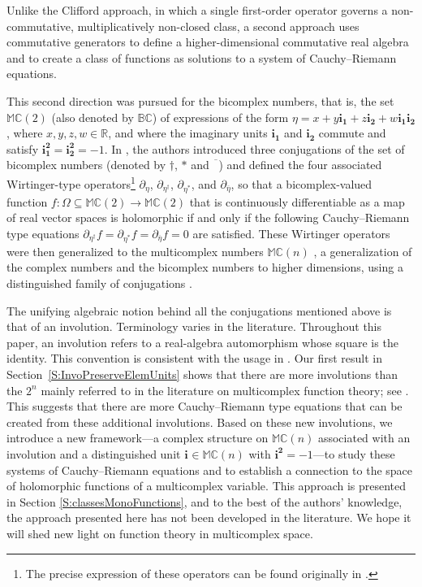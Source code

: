 \documentclass[12pt]{amsart}
\theoremstyle{plain}
\theoremstyle{definition}
\numberwithin{equation}{section}
\newcommand{\im}[1]{\mathbf{ i_{#1}}}
\newcommand{\ims}[1]{\mathbf{ i_{#1}^2}}
\newcommand{\mB}{\mathbb{B}}
\newcommand{\mC}{\mathbb{C}}
\newcommand{\mR}{\mathbb{R}}
\newcommand{\mM}{\mathbb{M}}
\newcommand{\ra}{\rightarrow}
\begin{document}
Unlike the Clifford approach, in which a single first-order operator governs a non-commutative, multiplicatively non-closed class, a second approach uses commutative generators to define a higher-dimensional commutative real algebra and to create a class of functions as solutions to a system of Cauchy--Riemann equations.

This second direction was pursued for the bicomplex numbers, that is, the set $\mM \mC(2)$ (also denoted by $\mB \mC$) of expressions of the form $\eta = x + y \im{1} + z \im{2} + w \im{1}\im{2}$, where $x, y, z, w \in \mR$, and where the imaginary units $\im{1}$ and $\im{2}$ commute and satisfy $\ims{1} = \ims{2} = -1$. 
In \cite{Bicomplex}, the authors introduced three conjugations of the set of bicomplex numbers (denoted by $\dagger$, $\ast$ and $\overline{\phantom{2}}$) and defined the four associated Wirtinger-type operators\footnote{The precise expression of these operators can be found originally in \cite{RochonShapiro}.} $\partial_{\eta}$, $\partial_{\eta^\dagger}$, $\partial_{\eta^\ast}$, and $\partial_{\overline{\eta}}$, so that a bicomplex-valued function $f : \Omega \subseteq \mM \mC(2) \ra \mM \mC(2)$ that is continuously differentiable as a map of real vector spaces is holomorphic if and only if the following Cauchy--Riemann type equations $\partial_{\eta^\dagger} f = \partial_{\eta^\ast} f = \partial_{\overline{\eta}} f = 0$ are satisfied. These Wirtinger operators were then generalized to the multicomplex numbers $\mM \mC(n)$ \cite{Baley}, a generalization of the complex numbers and the bicomplex numbers to higher dimensions, using a distinguished family of conjugations \cite{Struppa2012}.

The unifying algebraic notion behind all the conjugations mentioned above is that of an involution. Terminology varies in the literature. Throughout this paper, an involution refers to a real-algebra automorphism whose square is the identity. This convention is consistent with the usage in \cite{SangwineTodd2007,Lawson2021,Parise}. Our first result in Section~\ref{S:InvoPreserveElemUnits} shows that there are more involutions than the $2^n$ mainly referred to in the literature on multicomplex function theory; see \cite{ CourchesneTremblay2025, Pelletier2009, Bicomplex, RochonShapiro, RochonTremblay2004, Struppa2012}. This suggests that there are more Cauchy--Riemann type equations that can be created from these additional involutions. Based on these new involutions, we introduce a new framework—a complex structure on $\mM \mC (n)$ associated with an involution and a distinguished unit $\im{} \in \mM \mC (n)$ with $\ims{} = -1$—to study these systems of Cauchy--Riemann equations and to establish a connection to the space of holomorphic functions of a multicomplex variable. This approach is presented in Section \ref{S:classesMonoFunctions}, and to the best of the authors' knowledge, the approach presented here has not been developed in the literature. We hope it will shed new light on function theory in multicomplex space. 
\end{document}

